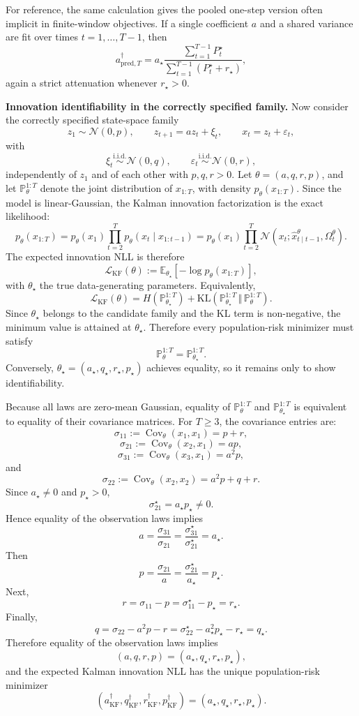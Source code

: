 \documentclass{article}
\theoremstyle{plain}
\theoremstyle{definition}
\theoremstyle{remark}
\newcommand{\E}{\mathbb{E}}
\newcommand{\KL}{\mathrm{KL}}
\begin{document}
For reference, the same calculation gives the pooled one-step version often
implicit in finite-window objectives. If a single coefficient $a$ and a shared variance are fit over times $t=1,\ldots,T-1$, then
\[
a_{\mathrm{pred},T}^\dagger
=
a_\star
\frac{\sum_{t=1}^{T-1}P_t^\star}
	{\sum_{t=1}^{T-1}(P_t^\star+r_\star)},
\]
again a strict attenuation whenever $r_\star>0$.

\textbf{Innovation identifiability in the correctly specified family.}
Now consider the correctly specified state-space family
\[
z_1\sim\mathcal N(0,p),\qquad
z_{t+1}=az_t+\xi_t,\qquad
x_t=z_t+\varepsilon_t,
\]
with
\[
\xi_t\overset{\mathrm{i.i.d.}}{\sim}\mathcal N(0,q),
\qquad
\varepsilon_t\overset{\mathrm{i.i.d.}}{\sim}\mathcal N(0,r),
\]
independently of $z_1$ and of each other with $p,q,r>0$. Let $\theta=(a,q,r,p)$, and let $\mathbb P_\theta^{1:T}$ denote the joint distribution of $x_{1:T}$, with density $p_\theta(x_{1:T})$. Since the model is linear-Gaussian, the Kalman innovation factorization is the exact likelihood:
\[
p_\theta(x_{1:T})
=
p_\theta(x_1)
\prod_{t=2}^{T}
p_\theta(x_t\mid x_{1:t-1})
=
p_\theta(x_1)
\prod_{t=2}^{T}
\mathcal N(x_t;\hat x^\theta_{t\mid t-1},\Omega^\theta_t).
\]
The expected innovation NLL is therefore
\[
\mathcal L_{\mathrm{KF}}(\theta)
:=
\E_{\theta_\star} \left[-\log p_\theta(x_{1:T})\right],
\]
with $\theta_\star$ the true data-generating parameters. Equivalently,
\[
\mathcal L_{\mathrm{KF}}(\theta)
=
H(\mathbb P_{\theta_\star}^{1:T})
+
\KL \left(
\mathbb P_{\theta_\star}^{1:T}
\,\Vert\,
\mathbb P_{\theta}^{1:T}
\right).
\]
Since $\theta_\star$ belongs to the candidate family and the KL term is non-negative, the minimum value is attained at $\theta_\star$. Therefore every population-risk minimizer must satisfy
\[
\mathbb P_{\theta}^{1:T}=\mathbb P_{\theta_\star}^{1:T}.
\]
Conversely, $\theta_\star=(a_\star,q_\star,r_\star,p_\star)$ achieves equality,
so it remains only to show identifiability.


Because all laws are zero-mean Gaussian, equality of
 $\mathbb P_{\theta}^{1:T} $ and  $\mathbb P_{\theta_\star}^{1:T} $ is equivalent to equality of their covariance matrices. For $T\ge3$, the covariance entries are:
\[
\sigma_{11}:=\operatorname{Cov}_\theta(x_1,x_1)=p+r,
\]
\[
\sigma_{21}:=\operatorname{Cov}_\theta(x_2,x_1)=ap,
\]
\[
\sigma_{31}:=\operatorname{Cov}_\theta(x_3,x_1)=a^2p,
\]
and
\[
\sigma_{22}:=\operatorname{Cov}_\theta(x_2,x_2)=a^2p+q+r.
\]
Since $a_\star\neq0$ and $p_\star>0$,
\[
\sigma_{21}^\star=a_\star p_\star\neq0.
\]
Hence equality of the observation laws implies
\[
a
=
\frac{\sigma_{31}}{\sigma_{21}}
=
\frac{\sigma_{31}^\star}{\sigma_{21}^\star}
=
a_\star.
\]
Then
\[
p
=
\frac{\sigma_{21}}{a}
=
\frac{\sigma_{21}^\star}{a_\star}
=
p_\star.
\]
Next,
\[
r
=
\sigma_{11}-p
=
\sigma_{11}^\star-p_\star
=
r_\star.
\]
Finally,
\[
q
=
\sigma_{22}-a^2p-r
=
\sigma_{22}^\star-a_\star^2p_\star-r_\star
=
q_\star.
\]
Therefore equality of the observation laws implies
\[
(a,q,r,p)=(a_\star,q_\star,r_\star,p_\star), 
\]
and the expected Kalman innovation NLL has the unique population-risk minimizer
\[
(a^\dagger_{\mathrm{KF}},q^\dagger_{\mathrm{KF}},
r^\dagger_{\mathrm{KF}},p^\dagger_{\mathrm{KF}})
=
(a_\star,q_\star,r_\star,p_\star).
\]
\end{document}
